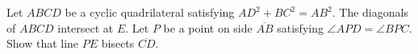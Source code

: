 Let $ABCD$ be a cyclic quadrilateral satisfying $AD^2 + BC^2 = AB^2$. The diagonals of $ABCD$ intersect at $E$. Let $P$ be a point on side $\overline{AB}$ satisfying $\angle APD = \angle BPC$. Show that line $PE$ bisects $\overline{CD}$.
